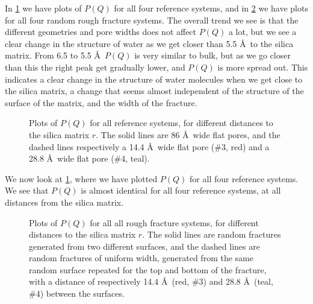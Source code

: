 In \cref{fig:top_all_reference} we have plots of $P(Q)$ for all four reference systems, and in \cref{fig:top_all_rough} we have plots for all four random rough fracture systems. The overall trend we see is that the different geometries and pore widths does not affect $P(Q)$ a lot, but we see a clear change in the structure of water as we get closer than 5.5 \AA\ to the silica matrix. From 6.5 to 5.5 \AA\ $P(Q)$ is very similar to bulk, but as we go closer than this the right peak get gradually lower, and $P(Q)$ is more spread out. This indicates a clear change in the structure of water molecules when we get close to the silica matrix, a change that seems almost independent of the structure of the surface of the matrix, and the width of the fracture.

%
\begin{figure}[!p]%
    \centering%
    \captionsetup{width=\textwidth}%
    \caption{%
        Plots of $P(Q)$ for all reference systems, for different distances to the silica matrix $r$. The solid lines are 86 \AA\ wide flat pores, and the dashed lines respectively a 14.4 \AA\ wide flat pore (\#3, red) and a 28.8 \AA\ wide flat pore (\#4, teal).%
        \label{fig:top_all_reference}%
    }%
\end{figure}%

We now look at \cref{fig:top_all_reference}, where we have plotted $P(Q)$ for all four reference systems. We see that $P(Q)$ is almost identical for all four reference systems, at all distances from the silica matrix.

%
\begin{figure}[!p]%
    \centering%
    \captionsetup{width=\textwidth}%
    \caption{%
        Plots of $P(Q)$ for all all rough fracture systems, for different distances to the silica matrix $r$. The solid lines are random fractures generated from two different surfaces, and the dashed lines are random fractures of uniform width, generated from the same random surface repeated for the top and bottom of the fracture, with a distance of respectively 14.4 \AA\ (red, \#3) and 28.8 \AA\ (teal, \#4) between the surfaces.%
        \label{fig:top_all_rough}%
    }%
\end{figure}%

